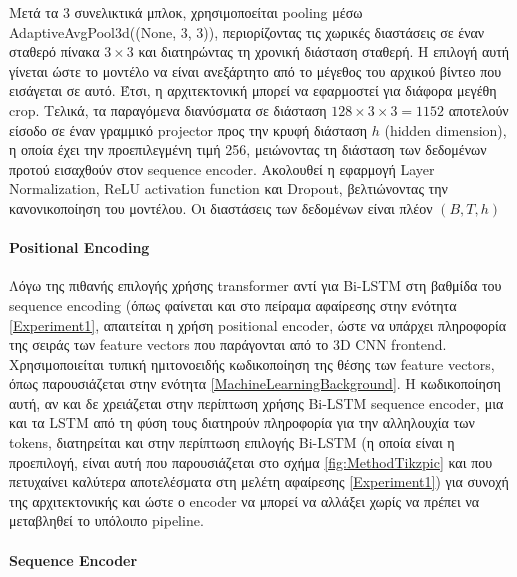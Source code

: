 Μετά τα 3 συνελικτικά μπλοκ, χρησιμοποείται pooling μέσω AdaptiveAvgPool3d((None, 3, 3)), περιορίζοντας τις χωρικές διαστάσεις σε έναν σταθερό πίνακα $3\times3$ και διατηρώντας τη χρονική διάσταση σταθερή. Η επιλογή αυτή γίνεται ώστε το μοντέλο να είναι ανεξάρτητο από το μέγεθος του αρχικού βίντεο που εισάγεται σε αυτό. Έτσι, η αρχιτεκτονική μπορεί να εφαρμοστεί για διάφορα μεγέθη crop. Τελικά, τα παραγόμενα διανύσματα σε διάσταση $128\times3\times3 = 1152$ αποτελούν είσοδο σε έναν γραμμικό projector προς την κρυφή διάσταση $h$ (hidden dimension), η οποία έχει την προεπιλεγμένη τιμή 256, μειώνοντας τη διάσταση των δεδομένων προτού εισαχθούν στον sequence encoder. Ακολουθεί η εφαρμογή Layer Normalization, ReLU activation function και Dropout, βελτιώνοντας την κανονικοποίηση του μοντέλου. Οι διαστάσεις των δεδομένων είναι πλέον $(B,T,h)$

\paragraph{Positional Encoding}

Λόγω της πιθανής επιλογής χρήσης transformer αντί για Bi-LSTM στη βαθμίδα του sequence encoding (όπως φαίνεται και στο πείραμα αφαίρεσης στην ενότητα \ref{Experiment1}, απαιτείται η χρήση positional encoder, ώστε να υπάρχει πληροφορία της σειράς των feature vectors που παράγονται από το 3D CNN frontend. Χρησιμοποιείται τυπική ημιτονοειδής κωδικοποίηση της θέσης των feature vectors, όπως παρουσιάζεται στην ενότητα \ref{MachineLearningBackground}. Η κωδικοποίηση αυτή, αν και δε χρειάζεται στην περίπτωση χρήσης Bi-LSTM sequence encoder, μια και τα LSTM από τη φύση τους διατηρούν πληροφορία για την αλληλουχία των tokens, διατηρείται και στην περίπτωση επιλογής Bi-LSTM (η οποία είναι η προεπιλογή, είναι αυτή που παρουσιάζεται στο σχήμα \ref{fig:MethodTikzpic} και που πετυχαίνει καλύτερα αποτελέσματα στη μελέτη αφαίρεσης \ref{Experiment1}) για συνοχή της αρχιτεκτονικής και ώστε ο encoder να μπορεί να αλλάξει χωρίς να πρέπει να μεταβληθεί το υπόλοιπο pipeline.

\paragraph{Sequence Encoder}

